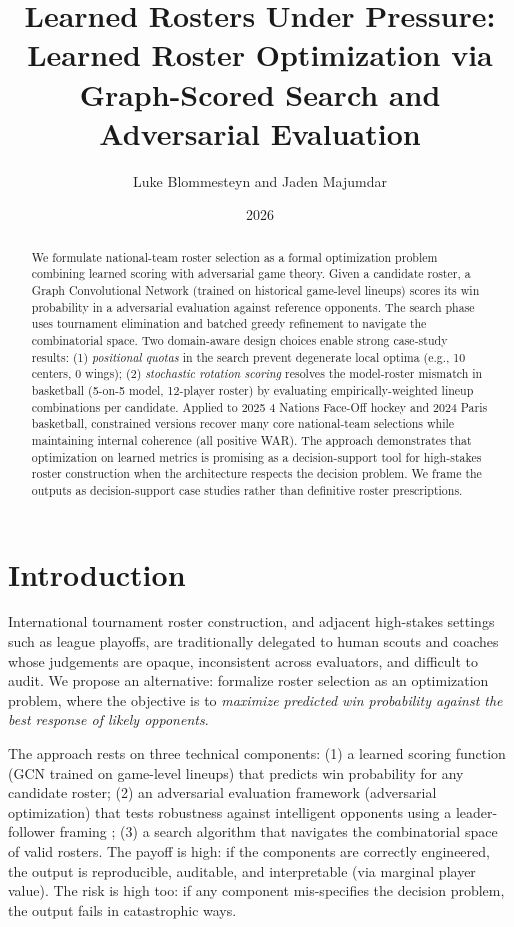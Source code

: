 \documentclass[11pt,letterpaper]{article}
\title{Learned Rosters Under Pressure: Learned Roster Optimization via\\
Graph-Scored Search and Adversarial Evaluation}
\author{Luke Blommesteyn and Jaden Majumdar}
\date{2026}
\begin{document}
\maketitle

\begin{abstract}
We formulate national-team roster selection as a formal optimization
problem combining learned scoring with adversarial game theory. Given
a candidate roster, a Graph Convolutional Network (trained on
historical game-level lineups) scores its win probability in a
adversarial evaluation against reference opponents. The search phase
uses tournament elimination and batched greedy refinement to navigate
the combinatorial space. Two domain-aware design choices enable
strong case-study results: (1) \emph{positional quotas} in the search
prevent degenerate local optima (e.g., 10 centers, 0 wings); (2)
\emph{stochastic rotation scoring} resolves the model-roster mismatch
in basketball (5-on-5 model, 12-player roster) by evaluating
empirically-weighted lineup combinations per candidate. Applied to 2025
4 Nations Face-Off hockey and 2024 Paris basketball, constrained
versions recover many core national-team selections while maintaining
internal coherence (all positive WAR). The approach demonstrates that
optimization on learned metrics is promising as a decision-support tool
for high-stakes roster construction when the architecture respects the
decision problem. We frame the outputs as decision-support case studies
rather than definitive roster prescriptions.
\end{abstract}

\section{Introduction}

International tournament roster construction, and adjacent high-stakes
settings such as league playoffs, are traditionally delegated to human
scouts and coaches whose judgements are opaque, inconsistent across
evaluators, and difficult to audit. We propose an alternative:
formalize roster selection as an optimization problem, where the
objective is to
\emph{maximize predicted win probability against the best response of
likely opponents}.

The approach rests on three technical components: (1) a learned
scoring function (GCN trained on game-level lineups) that predicts
win probability for any candidate roster; (2) an adversarial
evaluation framework (adversarial optimization) that tests robustness
against intelligent opponents using a leader-follower framing
\cite{conitzer2006commit}; (3) a search algorithm that navigates the
combinatorial space of valid rosters. The payoff is high: if the
components are correctly engineered, the output is reproducible,
auditable, and interpretable (via marginal player value). The risk is
high too: if any component mis-specifies the decision problem, the
output fails in catastrophic ways.
\end{document}
